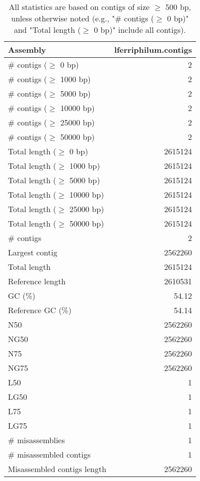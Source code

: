 \documentclass[12pt,a4paper]{article}
\begin{document}
\begin{table}[ht]
\begin{center}
\caption{All statistics are based on contigs of size $\geq$ 500 bp, unless otherwise noted (e.g., "\# contigs ($\geq$ 0 bp)" and "Total length ($\geq$ 0 bp)" include all contigs).}
\begin{tabular}{|l*{1}{|r}|}
\hline
Assembly & lferriphilum.contigs \\ \hline
\# contigs ($\geq$ 0 bp) & 2 \\ \hline
\# contigs ($\geq$ 1000 bp) & 2 \\ \hline
\# contigs ($\geq$ 5000 bp) & 2 \\ \hline
\# contigs ($\geq$ 10000 bp) & 2 \\ \hline
\# contigs ($\geq$ 25000 bp) & 2 \\ \hline
\# contigs ($\geq$ 50000 bp) & 2 \\ \hline
Total length ($\geq$ 0 bp) & 2615124 \\ \hline
Total length ($\geq$ 1000 bp) & 2615124 \\ \hline
Total length ($\geq$ 5000 bp) & 2615124 \\ \hline
Total length ($\geq$ 10000 bp) & 2615124 \\ \hline
Total length ($\geq$ 25000 bp) & 2615124 \\ \hline
Total length ($\geq$ 50000 bp) & 2615124 \\ \hline
\# contigs & 2 \\ \hline
Largest contig & 2562260 \\ \hline
Total length & 2615124 \\ \hline
Reference length & 2610531 \\ \hline
GC (\%) & 54.12 \\ \hline
Reference GC (\%) & 54.14 \\ \hline
N50 & 2562260 \\ \hline
NG50 & 2562260 \\ \hline
N75 & 2562260 \\ \hline
NG75 & 2562260 \\ \hline
L50 & 1 \\ \hline
LG50 & 1 \\ \hline
L75 & 1 \\ \hline
LG75 & 1 \\ \hline
\# misassemblies & 1 \\ \hline
\# misassembled contigs & 1 \\ \hline
Misassembled contigs length & 2562260 \\ \hline

\end{tabular}
\end{center}
\end{table}
\end{document}
